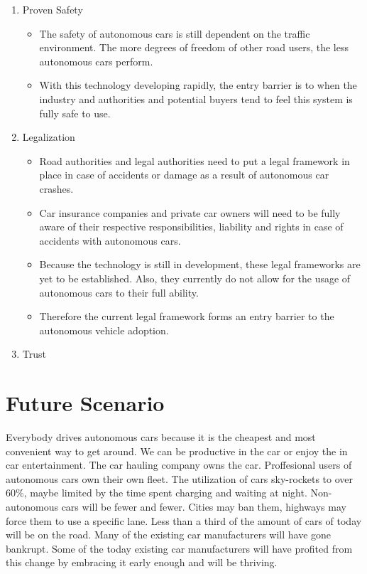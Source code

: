 \documentclass[a4paper]{article}
\begin{document}
\begin{enumerate}
    \item Proven Safety
    \begin{itemize}
        \item The safety of autonomous cars is still dependent on the traffic environment. The more degrees of freedom of other road users, the less autonomous cars perform. 
        \item With this technology developing rapidly, the entry barrier is to when the industry and authorities and potential buyers tend to feel this system is fully safe to use.
    \end{itemize}
    \item Legalization
    \begin{itemize}
        \item Road authorities and legal authorities need to put a legal framework in place in case of accidents or damage as a result of autonomous car crashes. 
        \item Car insurance companies and private car owners will need to be fully aware of their respective responsibilities, liability and rights in case of accidents with autonomous cars.
        \item Because the technology is still in development, these legal frameworks are yet to be established. Also, they currently do not allow for the usage of autonomous cars to their full ability.
        \item Therefore the current legal framework forms an entry barrier to the autonomous vehicle adoption.
    \end{itemize}
    \item Trust
 \end{enumerate}



\section{Future Scenario}
\label{sec:future-scenario}

Everybody drives autonomous cars because it is the cheapest and most convenient way to get around.
We can be productive in the car or enjoy the in car entertainment.
The car hauling company owns the car.
Proffesional users of autonomous cars own their own fleet.
The utilization of cars sky-rockets to over $60\%$, maybe limited by the time spent charging and waiting at night.
Non-autonomous cars will be fewer and fewer. Cities may ban them, highways may force them to use a specific lane.
Less than a third of the amount of cars of today will be on the road.
Many of the existing car manufacturers will have gone bankrupt.
Some of the today existing car manufacturers will have profited from this change by embracing it early enough and will be thriving.
\end{document}
